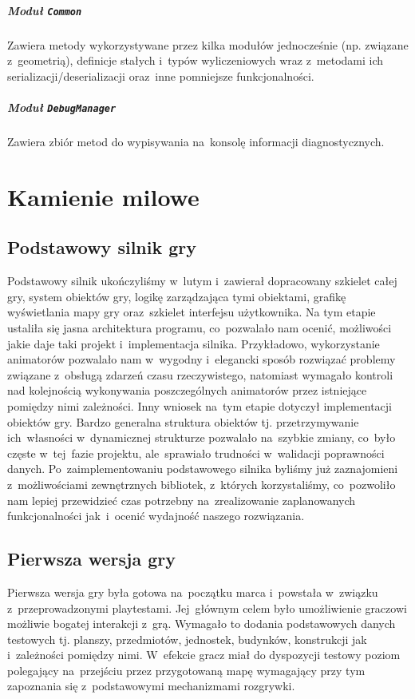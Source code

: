 \documentclass[licencjacka]{pracamgr}
\begin{document}
    \paragraph{Moduł \texttt{Common}}
      Zawiera metody wykorzystywane przez kilka modułów jednocześnie (np. związane z~geometrią), definicje stałych i~typów wyliczeniowych
      wraz z~metodami ich serializacji/deserializacji oraz~inne pomniejsze funkcjonalności.
    \paragraph{Moduł \texttt{DebugManager}}
      Zawiera zbiór metod do wypisywania na~konsolę informacji diagnostycznych.

  \chapter{Kamienie milowe}
    \section{Podstawowy silnik gry}
    Podstawowy silnik ukończyliśmy w~lutym i~zawierał dopracowany szkielet całej gry, system obiektów gry,
    logikę zarządzająca tymi obiektami, grafikę wyświetlania mapy gry oraz~szkielet interfejsu użytkownika.
    Na tym etapie ustaliła się jasna architektura programu, co~pozwalało nam ocenić, możliwości jakie
    daje taki projekt i~implementacja silnika. Przykładowo, wykorzystanie animatorów pozwalało nam w~wygodny
    i~elegancki sposób rozwiązać problemy związane z~obsługą zdarzeń czasu rzeczywistego, natomiast wymagało kontroli
    nad kolejnością wykonywania poszczególnych animatorów przez istniejące pomiędzy nimi zależności. Inny wniosek
    na~tym etapie dotyczył implementacji obiektów gry. Bardzo generalna struktura obiektów tj. przetrzymywanie
    ich~własności w~dynamicznej strukturze pozwalało na~szybkie zmiany, co~było częste w~tej~fazie projektu,
    ale~sprawiało trudności w~walidacji poprawności danych.
    Po~zaimplementowaniu podstawowego silnika byliśmy już zaznajomieni z~możliwościami zewnętrznych bibliotek,
    z~których korzystaliśmy, co~pozwoliło nam lepiej przewidzieć czas potrzebny na~zrealizowanie zaplanowanych
    funkcjonalności jak~i~ocenić wydajność naszego rozwiązania.

    \section{Pierwsza wersja gry}
    Pierwsza wersja gry była gotowa na~początku marca i~powstała w~związku z~przeprowadzonymi playtestami. Jej~głównym
    celem było umożliwienie graczowi możliwie bogatej interakcji z~grą. Wymagało to dodania podstawowych
    danych testowych tj. planszy, przedmiotów, jednostek, budynków, konstrukcji jak i~zależności pomiędzy nimi.
    W~efekcie gracz miał do dyspozycji testowy poziom polegający na~przejściu przez przygotowaną mapę wymagający
    przy tym zapoznania się z~podstawowymi mechanizmami rozgrywki.
\end{document}
